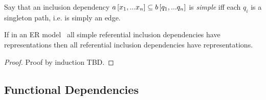 \begin{definition}
Say that an inclusion dependency $a\left[x_1,...x_n\right]\subseteq b\left[q_1,...q_n\right]$ is \textit{simple}
iff each $q_i$ is a singleton path, i.e. is simply an edge. 
\end{definition}

\begin{lemma}
\label{simplerepresentationlemma}
If in an ER model \genericmodel\ all simple referential inclusion dependencies
have representations  then all referential inclusion dependencies have representations. 
\end{lemma}
\begin{proof}
Proof by induction TBD.  
\end{proof}

\subsection{Functional Dependencies}

